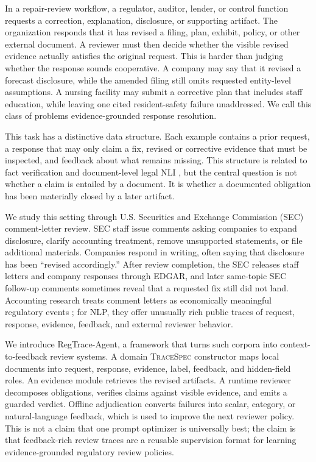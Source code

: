 \documentclass[11pt]{article}
\newcommand{\task}{evidence-grounded response resolution}
\newcommand{\framework}{RegTrace-Agent}
\begin{document}
In a repair-review workflow, a regulator, auditor, lender, or control function requests a correction, explanation, disclosure, or supporting artifact. The organization responds that it has revised a filing, plan, exhibit, policy, or other external document. A reviewer must then decide whether the visible revised evidence actually satisfies the original request. This is harder than judging whether the response sounds cooperative. A company may say that it revised a forecast disclosure, while the amended filing still omits requested entity-level assumptions. A nursing facility may submit a corrective plan that includes staff education, while leaving one cited resident-safety failure unaddressed. We call this class of problems \task{}.

This task has a distinctive data structure. Each example contains a prior request, a response that may only claim a fix, revised or corrective evidence that must be inspected, and feedback about what remains missing. This structure is related to fact verification and document-level legal NLI \citep{thorne2018fever,koreeda2021contractnli}, but the central question is not whether a claim is entailed by a document. It is whether a documented obligation has been materially closed by a later artifact.

We study this setting through U.S. Securities and Exchange Commission (SEC) comment-letter review. SEC staff issue comments asking companies to expand disclosure, clarify accounting treatment, remove unsupported statements, or file additional materials. Companies respond in writing, often saying that disclosure has been ``revised accordingly.'' After review completion, the SEC releases staff letters and company responses through EDGAR, and later same-topic SEC follow-up comments sometimes reveal that a requested fix still did not land. Accounting research treats comment letters as economically meaningful regulatory events \citep{cassell2013sec,bozanic2017sec,baugh2023auditor,ryans2021comment}; for NLP, they offer unusually rich public traces of request, response, evidence, feedback, and external reviewer behavior.

We introduce \framework{}, a framework that turns such corpora into context-to-feedback review systems. A domain \textsc{TraceSpec} constructor maps local documents into request, response, evidence, label, feedback, and hidden-field roles. An evidence module retrieves the revised artifacts. A runtime reviewer decomposes obligations, verifies claims against visible evidence, and emits a guarded verdict. Offline adjudication converts failures into scalar, category, or natural-language feedback, which is used to improve the next reviewer policy. This is not a claim that one prompt optimizer is universally best; the claim is that feedback-rich review traces are a reusable supervision format for learning evidence-grounded regulatory review policies.
\end{document}
